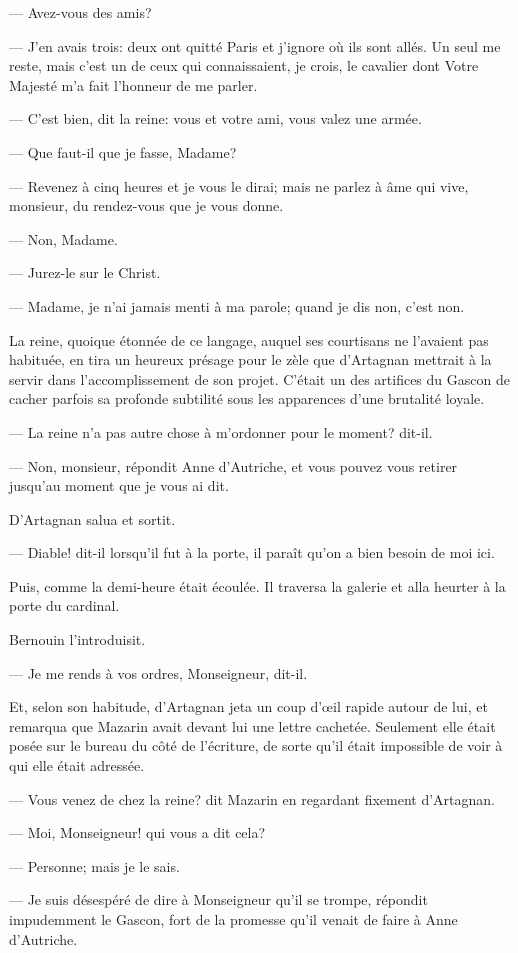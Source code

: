 — Avez-vous des amis?

— J'en avais trois: deux ont quitté Paris et j'ignore où ils sont allés. Un seul me reste, mais c'est un de ceux qui connaissaient, je crois, le cavalier dont Votre Majesté m'a fait l'honneur de me parler.

— C'est bien, dit la reine: vous et votre ami, vous valez une armée.

— Que faut-il que je fasse, Madame?

— Revenez à cinq heures et je vous le dirai; mais ne parlez à âme qui vive, monsieur, du rendez-vous que je vous donne.

— Non, Madame.

— Jurez-le sur le Christ.

— Madame, je n'ai jamais menti à ma parole; quand je dis non, c'est non.

La reine, quoique étonnée de ce langage, auquel ses courtisans ne l'avaient pas habituée, en tira un heureux présage pour le zèle que d'Artagnan mettrait à la servir dans l'accomplissement de son projet. C'était un des artifices du Gascon de cacher parfois sa profonde subtilité sous les apparences d'une brutalité loyale.

— La reine n'a pas autre chose à m'ordonner pour le moment? dit-il.

— Non, monsieur, répondit Anne d'Autriche, et vous pouvez vous retirer jusqu'au moment que je vous ai dit.

D'Artagnan salua et sortit.

— Diable! dit-il lorsqu'il fut à la porte, il paraît qu'on a bien besoin de moi ici.

Puis, comme la demi-heure était écoulée. Il traversa la galerie et alla heurter à la porte du cardinal.

Bernouin l'introduisit.

— Je me rends à vos ordres, Monseigneur, dit-il.

Et, selon son habitude, d'Artagnan jeta un coup d'œil rapide autour de lui, et remarqua que Mazarin avait devant lui une lettre cachetée. Seulement elle était posée sur le bureau du côté de l'écriture, de sorte qu'il était impossible de voir à qui elle était adressée.

— Vous venez de chez la reine? dit Mazarin en regardant fixement d'Artagnan.

— Moi, Monseigneur! qui vous a dit cela?

— Personne; mais je le sais.

— Je suis désespéré de dire à Monseigneur qu'il se trompe, répondit impudemment le Gascon, fort de la promesse qu'il venait de faire à Anne d'Autriche.

